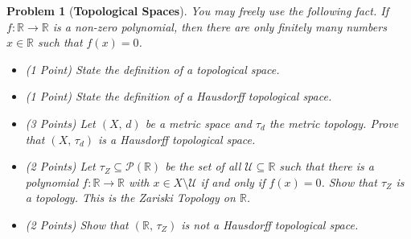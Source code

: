 \documentclass{article}
\theoremstyle{normal}
\newtheorem{problem}{Problem}
\begin{document}
    \begin{problem}[\textbf{Topological Spaces}]
        \par\hfill\par
        You may freely use the following fact. If
        $f:\mathbb{R}\rightarrow\mathbb{R}$ is a non-zero polynomial, then
        there are only finitely many numbers $x\in\mathbb{R}$ such that
        $f(x)=0$.
        \begin{itemize}
            \item (1 Point) State the definition of a topological space.
            \item (1 Point) State the definition of a
                Hausdorff topological space.
            \item (3 Points) Let $(X,\,d)$ be a metric space and $\tau_{d}$ the
                metric topology. Prove that $(X,\,\tau_{d})$ is a Hausdorff
                topological space.
            \item (2 Points) Let $\tau_{Z}\subseteq\mathcal{P}(\mathbb{R})$ be
                the set of all $\mathcal{U}\subseteq\mathbb{R}$ such that
                there is a polynomial $f:\mathbb{R}\rightarrow\mathbb{R}$
                with $x\in{X}\setminus\mathcal{U}$ if and only if
                $f(x)=0$. Show that $\tau_{Z}$ is a topology. This is the
                \textit{Zariski Topology} on $\mathbb{R}$.
            \item (2 Points) Show that $(\mathbb{R},\,\tau_{Z})$ is not
                a Hausdorff topological space.
        \end{itemize}
    \end{problem}
\end{document}
